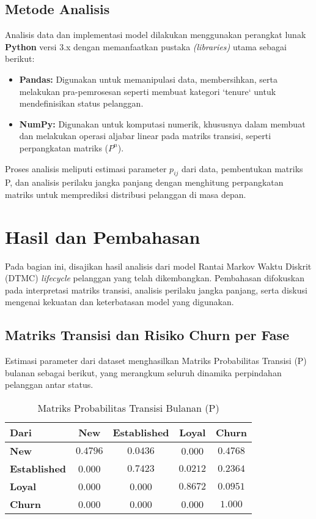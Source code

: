 \documentclass[a4paper,12pt]{article}
\begin{document}
\subsection{Metode Analisis}
Analisis data dan implementasi model dilakukan menggunakan perangkat lunak \textbf{Python} versi 3.x dengan memanfaatkan pustaka \textit{(libraries)} utama sebagai berikut:
\begin{itemize}
    \item \textbf{Pandas:} Digunakan untuk memanipulasi data, membersihkan, serta melakukan pra-pemrosesan seperti membuat kategori `tenure` untuk mendefinisikan status pelanggan.
    \item \textbf{NumPy:} Digunakan untuk komputasi numerik, khususnya dalam membuat dan melakukan operasi aljabar linear pada matriks transisi, seperti perpangkatan matriks ($P^n$).
\end{itemize}
Proses analisis meliputi estimasi parameter $p_{ij}$ dari data, pembentukan matriks P, dan analisis perilaku jangka panjang dengan menghitung perpangkatan matriks untuk memprediksi distribusi pelanggan di masa depan.

\section{Hasil dan Pembahasan}
Pada bagian ini, disajikan hasil analisis dari model Rantai Markov Waktu Diskrit (DTMC) \textit{lifecycle} pelanggan yang telah dikembangkan. Pembahasan difokuskan pada interpretasi matriks transisi, analisis perilaku jangka panjang, serta diskusi mengenai kekuatan dan keterbatasan model yang digunakan.

\subsection{Matriks Transisi dan Risiko Churn per Fase}
Estimasi parameter dari dataset menghasilkan Matriks Probabilitas Transisi (P) bulanan sebagai berikut, yang merangkum seluruh dinamika perpindahan pelanggan antar status.

\begin{table}[ht]
\centering
\caption{Matriks Probabilitas Transisi Bulanan (P)}
\label{tab:transition_matrix}
\begin{tabular}{l|cccc}
\hline
\textbf{\small{Dari}} & \textbf{New} & \textbf{Established} & \textbf{Loyal} & \textbf{Churn} \\
\hline
\textbf{New} & $0.4796$ & $0.0436$ & 0.000 & $0.4768$ \\
\textbf{Established} & 0.000 & $0.7423$ & $0.0212$ & $0.2364$ \\
\textbf{Loyal} & 0.000 & 0.000 & $0.8672$ & $0.0951$ \\
\textbf{Churn} & 0.000 & 0.000 & 0.000 & $1.000$ \\
\hline
\end{tabular}
\end{table}
\end{document}
